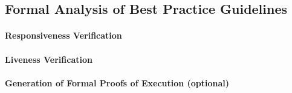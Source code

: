 \subsection{Formal Analysis of Best Practice Guidelines}

\paragraph{Responsiveness Verification}

\paragraph{Liveness Verification}


\paragraph{Generation of Formal Proofs of Execution (optional)}
